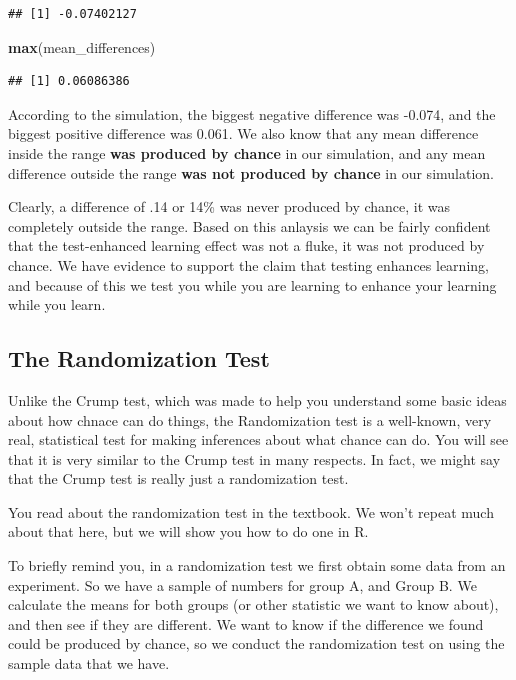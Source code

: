 \documentclass[]{book}
\newenvironment{Shaded}{\begin{snugshade}}{\end{snugshade}}
\newcommand{\KeywordTok}[1]{\textcolor[rgb]{0.13,0.29,0.53}{\textbf{{#1}}}}
\newcommand{\NormalTok}[1]{{#1}}
\theoremstyle{definition}
\theoremstyle{definition}
\theoremstyle{definition}
\theoremstyle{remark}
\begin{document}
\begin{verbatim}
## [1] -0.07402127
\end{verbatim}

\begin{Shaded}
\begin{Highlighting}[]
\KeywordTok{max}\NormalTok{(mean_differences)}
\end{Highlighting}
\end{Shaded}

\begin{verbatim}
## [1] 0.06086386
\end{verbatim}

According to the simulation, the biggest negative difference was -0.074,
and the biggest positive difference was 0.061. We also know that any
mean difference inside the range \textbf{was produced by chance} in our
simulation, and any mean difference outside the range \textbf{was not
produced by chance} in our simulation.

Clearly, a difference of .14 or 14\% was never produced by chance, it
was completely outside the range. Based on this anlaysis we can be
fairly confident that the test-enhanced learning effect was not a fluke,
it was not produced by chance. We have evidence to support the claim
that testing enhances learning, and because of this we test you while
you are learning to enhance your learning while you learn.

\subsection{The Randomization Test}\label{the-randomization-test}

Unlike the Crump test, which was made to help you understand some basic
ideas about how chnace can do things, the Randomization test is a
well-known, very real, statistical test for making inferences about what
chance can do. You will see that it is very similar to the Crump test in
many respects. In fact, we might say that the Crump test is really just
a randomization test.

You read about the randomization test in the textbook. We won't repeat
much about that here, but we will show you how to do one in R.

To briefly remind you, in a randomization test we first obtain some data
from an experiment. So we have a sample of numbers for group A, and
Group B. We calculate the means for both groups (or other statistic we
want to know about), and then see if they are different. We want to know
if the difference we found could be produced by chance, so we conduct
the randomization test on using the sample data that we have.
\end{document}

